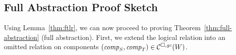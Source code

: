 \subsection{Full Abstraction Proof Sketch}
\label{subsec:proof-sketch}
Using Lemma~\ref{thm:ftlr}, we can now proceed to proving Theorem~\ref{thm:full-abstraction} (full abstraction).
First, we extend the logical relation into an omitted relation on components $(\mathit{comp}_S,\mathit{comp}_T) \in \mathcal{C}^{\square,\mathit{gc}}(W)$.
